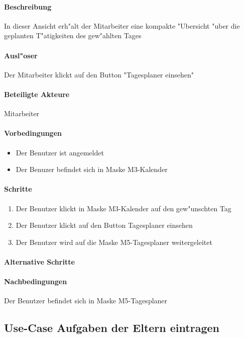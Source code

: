  \paragraph{Beschreibung}
  In dieser Ansicht erh"alt der Mitarbeiter eine kompakte "Ubersicht "uber die geplanten T"atigkeiten des gew"ahlten Tages
  \paragraph{Ausl"oser}
  Der Mitarbeiter klickt auf den Button "Tagesplaner einsehen"
  \paragraph{Beteiligte Akteure}   \leavevmode \newline
    Mitarbeiter
  \paragraph{Vorbedingungen}
  \begin{itemize}
   \item Der Benutzer ist angemeldet
   \item Der Benuzer befindet sich in Maske M3-Kalender
  \end{itemize}

  \paragraph{Schritte}
  \begin{enumerate}
   \item Der Benutzer klickt in Maske M3-Kalender auf den gew"unschten Tag
   \item Der Benutzer klickt auf den Button \dq Tagesplaner einsehen\dq
   \item Der Benutzer wird auf die Maske M5-Tagesplaner weitergeleitet
  \end{enumerate}

  \paragraph{Alternative Schritte}
  \paragraph{Nachbedingungen}
  Der Benutzer befindet sich in Maske M5-Tagesplaner

 
 \newpage
 \subsection{Use-Case Aufgaben der Eltern eintragen}
